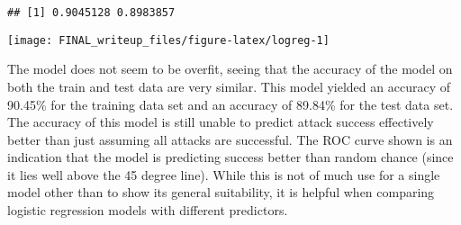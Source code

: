 \documentclass[11pt,letterpaper,]{article}
\newenvironment{Shaded}{\begin{snugshade}}{\end{snugshade}}
\newcommand{\KeywordTok}[1]{\textcolor[rgb]{0.13,0.29,0.53}{\textbf{{#1}}}}
\newcommand{\DataTypeTok}[1]{\textcolor[rgb]{0.13,0.29,0.53}{{#1}}}
\newcommand{\FloatTok}[1]{\textcolor[rgb]{0.00,0.00,0.81}{{#1}}}
\newcommand{\StringTok}[1]{\textcolor[rgb]{0.31,0.60,0.02}{{#1}}}
\newcommand{\CommentTok}[1]{\textcolor[rgb]{0.56,0.35,0.01}{\textit{{#1}}}}
\newcommand{\NormalTok}[1]{{#1}}
\theoremstyle{definition}
\theoremstyle{definition}
\theoremstyle{definition}
\theoremstyle{remark}
\begin{document}
\begin{Shaded}
\end{Shaded}

\begin{verbatim}
## [1] 0.9045128 0.8983857
\end{verbatim}

\begin{Shaded}
\end{Shaded}

\begin{center}\texttt{[image: FINAL\_writeup\_files/figure-latex/logreg-1]} \end{center}

The model does not seem to be overfit, seeing that the accuracy of the
model on both the train and test data are very similar. This model
yielded an accuracy of 90.45\% for the training data set and an accuracy
of 89.84\% for the test data set. The accuracy of this model is still
unable to predict attack success effectively better than just assuming
all attacks are successful. The ROC curve shown is an indication that
the model is predicting success better than random chance (since it lies
well above the 45 degree line). While this is not of much use for a
single model other than to show its general suitability, it is helpful
when comparing logistic regression models with different predictors.
\end{document}
